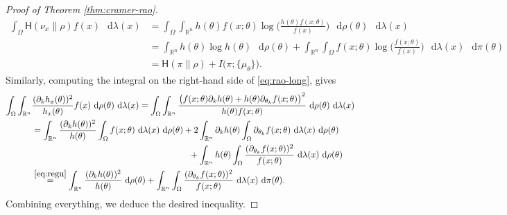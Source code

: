 \documentclass[a4paper,twoside,11pt,reqno]{amsart}
\newcommand*\diff{\mathop{}\!\mathrm{d}}
\newcommand{\R}{\mathbb{R}} %
\newcommand{\HH}{\mathsf{H}}
\begin{document}
\begin{proof} [Proof of Theorem \ref{thm:cramer-rao}]
\begin{equation}
\begin{split}
\int_\Omega \HH(\nu_x\|\rho)f(x) \,\diff\lambda(x) & = \int_\Omega \int_{\R^n} h(\theta) f(x;\theta) \log\Big( \frac{h(\theta)f(x;\theta)}{f(x)}\Big) \, \diff\rho(\theta)\,\diff\lambda(x) 
\\ & = \int_{\R^n} h(\theta) \log h(\theta)\,\diff\rho(\theta) + \int_{\R^n} \int_\Omega f(x;\theta) \log \big(\frac{f(x;\theta)}{f(x)} \big)\, \diff\lambda(x)\,\diff\pi(\theta)
\\ & = \HH(\pi\|\rho) + I\big(\pi;\{\mu_\theta\}\big).
\end{split}
\end{equation}
Similarly, computing the integral on the right-hand side of \eqref{eq:rao-long}, gives
\begin{equation*}
\begin{split}
 \int_\Omega \int_{\R^n} &\frac{(\partial_k h_x(\theta))^2}{h_x(\theta)}f(x) \,\diff\rho(\theta)\,\diff\lambda(x) =  \int_\Omega \int_{\R^n} \frac{\big(f(x;\theta)\partial_k h(\theta) + h(\theta) \partial_{\theta_k} f(x;\theta)\big)^2}{h(\theta)f(x;\theta)} \,\diff\rho(\theta)\,\diff\lambda(x)
 \\ & = \int_{\R^n}\frac{(\partial_k h(\theta))^2}{h(\theta)} \int_\Omega f(x;\theta) \, \diff\lambda(x)\,\diff\rho(\theta) + 2 \int_{\R^n} \partial_k h(\theta) \int_\Omega \partial_{\theta_k} f(x;\theta) \,\diff\lambda(x) \,\diff\rho(\theta)
 \\ & \qquad\qquad\qquad\qquad\qquad\qquad\qquad\qquad\qquad + \int_{\R^n} h(\theta) \int_\Omega \frac{(\partial_{\theta_k}f(x;\theta))^2}{f(x;\theta)}\,\diff\lambda(x)\,\diff\rho(\theta)
 \\ & \stackrel{\eqref{eq:regu}}{=} \int_{\R^n} \frac{(\partial_{k} h(\theta))^2}{h(\theta)}\,\diff\rho(\theta) + \int_{\R^n} \int_\Omega \frac{(\partial_{\theta_k} f(x;\theta))^2}{f(x;\theta)} \,\diff\lambda(x)\,\diff\pi(\theta).
\end{split}
\end{equation*}
Combining everything, we deduce the desired inequality.
\end{proof}
\end{document}
